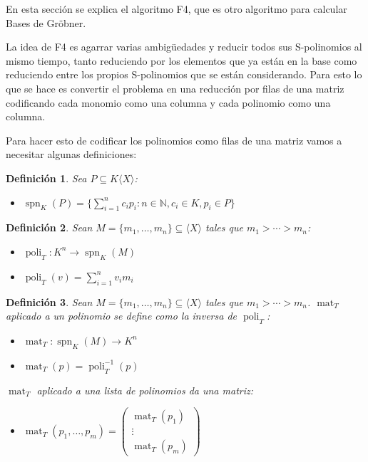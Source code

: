 \documentclass{report}
\theoremstyle{customstyle}
\newtheorem{definition}{Definición}[chapter]
\theoremstyle{factstyle}
\DeclareMathOperator{\spn}{spn} %
\DeclareMathOperator{\mat}{mat}
\DeclareMathOperator{\poli}{poli}
\begin{document}
En esta sección se explica el algoritmo F4, que es otro algoritmo para calcular Bases de Gröbner.

La idea de F4 es agarrar varias ambigüedades y reducir todos sus S-polinomios al mismo tiempo, tanto reduciendo por los elementos que ya están en la base como reduciendo entre los propios S-polinomios que se están considerando. Para esto lo que se hace es convertir el problema en una reducción por filas de una matriz codificando cada monomio como una columna y cada polinomio como una columna.

Para hacer esto de codificar los polinomios como filas de una matriz vamos a necesitar algunas definiciones:

\begin{definition}
Sea $P ⊆ K⟨X⟩$:

\begin{itemize}
  \item $\spn_K(P) = \{∑_{i = 1}^n c_i p_i : n ∈ ℕ, c_i ∈ K, p_i ∈ P\}$
\end{itemize}

\end{definition}

\begin{definition}
Sean $M = \{m_1, …, m_n\} ⊆ ⟨X⟩$ tales que $m_1 > ⋯ > m_n$:

\begin{itemize}
  \item $\poli_T : K^n → \spn_K(M)$
  \item $\poli_T(v) = ∑_{i = 1}^n v_i m_i$
\end{itemize}

\end{definition}

\begin{definition}
Sean $M = \{m_1, …, m_n\} ⊆ ⟨X⟩$ tales que $m_1 > ⋯ > m_n$. $\mat_T$ aplicado a un polinomio se define como la inversa de $\poli_T$:

\begin{itemize}
  \item $\mat_T : \spn_K(M) → K^n$
  \item $\mat_T(p) = \poli_T^{-1}(p)$
\end{itemize}

$\mat_T$ aplicado a una lista de polinomios da una matriz:

\begin{itemize}
  \item $\mat_T(p_1, …, p_m) = \begin{pmatrix} \mat_T(p_1) \\ ⋮ \\ \mat_T(p_m) \end{pmatrix}$
\end{itemize}

\end{definition}
\end{document}
